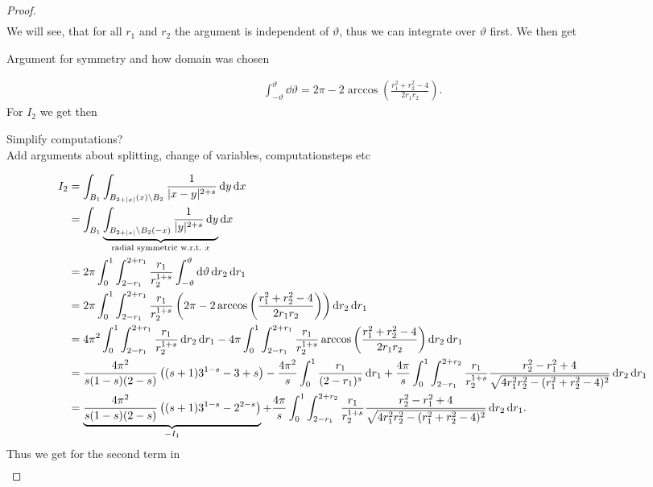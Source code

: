 \begin{proof}
\begin{gather}
	\end{gather}
	We will see, that for all \( r_1 \) and \( r_2 \) the argument is independent of \(
	\vartheta \), thus we can integrate over \( \vartheta \) first. We then get
	\begin{TODO}
		Argument for symmetry and how domain was chosen
	\end{TODO}
	\begin{gather}
		\int_{-\vartheta}^\vartheta \dd{\vartheta} = 2\pi - 2 \arccos\left(\frac{r_1^2+r_2^2-4}{2r_1 r_2}\right).
	\end{gather}
	For \( I_2 \) we get then
	\begin{TODO}
		Simplify computations?\\
		Add arguments about splitting, change of variables, computationsteps etc
	\end{TODO}
	\begin{align}
		I_2
		 & = \int_{B_1} \int_{B_{2+\lvert x\rvert} (x) \setminus B_2} \frac{1}{\lvert x - y \rvert^{2+s}} \dd{y} \dd{x} \\
		 & = \int_{B_1} \underbrace{\int_{B_{2+\lvert x\rvert} \setminus B_2(-x)} \frac{1}{\lvert y \rvert^{2+s}} \dd{y}}_{\text{radial symmetric w.r.t.\ \( x \)}} \dd{x} \\
		 & = 2 \pi \int_0^1 \int_{2-r_1}^{2+r_1} \frac{r_1}{r_2^{1+s}} \int_{-\vartheta}^\vartheta \dd{\vartheta} \dd{r_2} \dd{r_1} \\
		 & = 2 \pi \int_0^1 \int_{2-r_1}^{2+r_1} \frac{r_1}{r_2^{1+s}} \left( 2\pi -2 \arccos\left(\frac{r_1^2+r_2^2-4}{2r_1 r_2}\right) \right) \dd{r_2} \dd{r_1} \\
		 & = 4 \pi^2 \int_0^1 \int_{2-r_1}^{2+r_1} \frac{r_1}{r_2^{1+s}} \dd{r_2} \dd{r_1} - 4 \pi \int_0^1 \int_{2-r_1}^{2+r_1} \frac{r_1}{r_2^{1+s}} \arccos\left(\frac{r_1^2+r_2^2-4}{2r_1 r_2}\right) \dd{r_2} \dd{r_1} \\
		 & = \frac{4\pi^2}{s(1-s)(2-s)} \left( (s+1) 3^{1-s}-3+s \right) - \frac{4\pi^2}{s} \int_0^1 \frac{r_1}{(2-r_1)^s} \dd{r_1} + \frac{4\pi}{s} \int_0^1 \int_{2-r_1}^{2+r_2} \frac{r_1}{r_2^{1+s}} \frac{r_2^2 -r_1^2 +4}{\sqrt{4r_1^2 r_2^2 - (r_1^2 +r_2^2 -4)^2}} \dd{r_2} \dd{r_1} \\
		 & = \underbrace{\frac{4\pi^2}{s(1-s)(2-s)} \left((s+1) 3^{1-s} - 2^{2-s} \right)}_{-I_1} + \frac{4\pi}{s} \int_0^1 \int_{2-r_1}^{2+r_2} \frac{r_1}{r_2^{1+s}} \frac{r_2^2 -r_1^2 +4}{\sqrt{4r_1^2 r_2^2 - (r_1^2 +r_2^2 -4)^2}} \dd{r_2} \dd{r_1}.
	\end{align}
	Thus we get for the second term in 
	\begin{gather}

\end{gather}
\end{proof}
